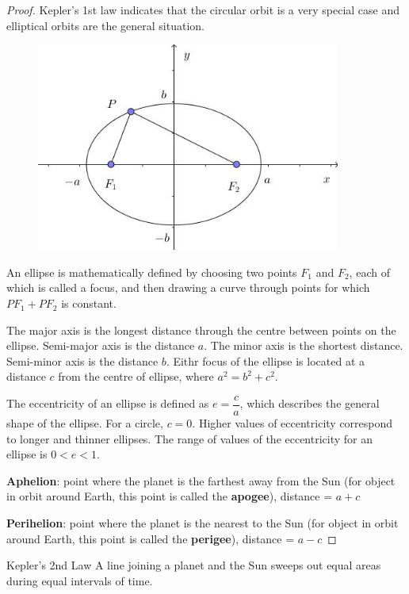 \begin{proof}
Kepler's 1st law indicates that the circular orbit is a very special case and elliptical orbits are the general situation.

\begin{figure}[H]
    \centering
    \includegraphics[width=10cm]{images/ellipse.jpg}
\end{figure}

An ellipse is mathematically defined by choosing two points $F_1$ and $F_2$, each of which is called a focus, and then drawing a curve through points for which $PF_1+PF_2$ is constant. 

The major axis is the longest distance through the centre between points on the ellipse. Semi-major axis is the distance $a$. The minor axis is the shortest distance. Semi-minor axis is the distance $b$. Eithr focus of the ellipse is located at a distance $c$ from the centre of ellipse, where $a^2=b^2+c^2$.

The eccentricity of an ellipse is defined as $e=\dfrac{c}{a}$, which describes the general shape of the ellipse. For a circle, $c=0$. Higher values of eccentricity correspond to longer and thinner ellipses. The range of values of the eccentricity for an ellipse is $0<e<1$.

\textbf{Aphelion}: point where the planet is the farthest away from the Sun (for object in orbit around Earth, this point is called the \textbf{apogee}), distance = $a+c$

\textbf{Perihelion}: point where the planet is the nearest to the Sun (for object in orbit around Earth, this point is called the \textbf{perigee}), distance = $a-c$
\end{proof}
\pagebreak

\begin{thrm}{Kepler's 2nd Law}{}
A line joining a planet and the Sun sweeps out equal areas during equal intervals of time.
\end{thrm}


